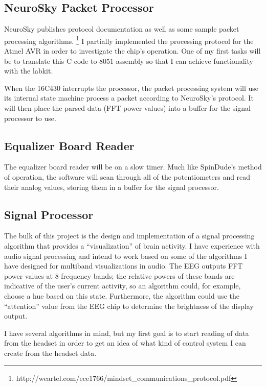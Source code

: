 \documentclass[letterpaper,10pt,notitlepage]{report}
\begin{document}
    \subsection{NeuroSky Packet Processor}
        NeuroSky publishes protocol documentation as well as some sample 
        packet processing algorithms.%
            \footnote{http://weartel.com/ece1766/mindset\_communications\_protocol.pdf}
        I partially implemented the processing protocol for the Atmel AVR in 
        order to investigate the chip's operation.  One of my first tasks will 
        be to translate this C code to 8051 assembly so that I can achieve 
        functionality with the labkit.

        When the 16C430 interrupts the processor, the packet processing system 
        will use its internal state machine process a packet according to 
        NeuroSky's protocol.  It will then place the parsed data (FFT power 
        values) into a buffer for the signal processor to use.

    \subsection{Equalizer Board Reader}
        The equalizer board reader will be on a slow timer.  Much like 
        SpinDude's method of operation, the software will scan through all of 
        the potentiometers and read their analog values, storing them in a 
        buffer for the signal processor.

    \subsection{Signal Processor}

        The bulk of this project is the design and implementation of a signal 
        processing algorithm that provides a ``visualization'' of brain 
        activity.  I have experience with audio signal processing and intend 
        to work based on some of the algorithms I have designed for multiband 
        visualizations in audio.  The EEG outputs FFT power values at 8 
        frequency bands; the relative powers of these bands are indicative 
        of the user's current activity, so an algorithm could, for example, 
        choose a hue based on this state.  Furthermore, the algorithm could 
        use the ``attention'' value from the EEG chip to determine the 
        brightness of the display output.

        I have several algorithms in mind, but my first goal is to start 
        reading of data from the headset in order to get an idea of what 
        kind of control system I can create from the headset data.
        
\end{document}
